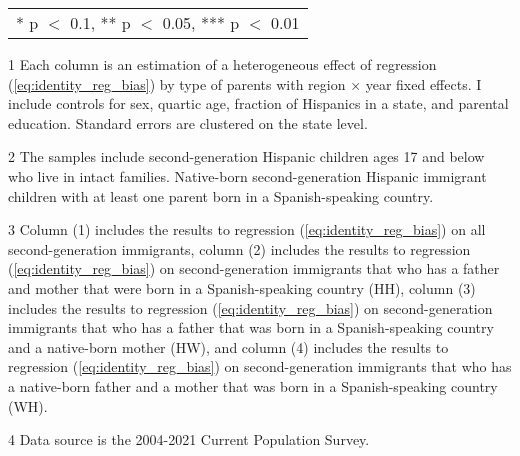 \begin{table}[H]
{\begin{threeparttable}
\begin{tabular}[t]{lcccc}
\bottomrule
\multicolumn{5}{l}{\rule{0pt}{1em}* p $<$ 0.1, ** p $<$ 0.05, *** p $<$ 0.01}\\
\end{tabular}
\begin{tablenotes}
\small
\item[1] \footnotesize{Each column is an estimation of a heterogeneous effect of regression (\ref{eq:identity_reg_bias}) by 
                      type of parents with region × year fixed effects. 
                      I include controls for sex, quartic age, fraction of Hispanics in a state, and parental education.
                      Standard errors are clustered on the state level.}
\item[2] \footnotesize{The samples include second-generation Hispanic children ages 17 and below who live in intact families. 
                      Native-born second-generation Hispanic 
                      immigrant children with at least one parent born in a Spanish-speaking 
                      country.}
\item[3] \footnotesize{Column (1) includes the results to regression (\ref{eq:identity_reg_bias}) on all second-generation immigrants, 
                                        column (2) includes the results to regression (\ref{eq:identity_reg_bias}) on second-generation immigrants that who has a father and mother that were born in a Spanish-speaking country (HH),
                                        column (3) includes the results to regression (\ref{eq:identity_reg_bias}) on second-generation immigrants that who has a father that was born in a Spanish-speaking country and a native-born mother (HW), and
                                        column (4) includes the results to regression (\ref{eq:identity_reg_bias}) on second-generation immigrants that who has a native-born father and a mother that was born in a Spanish-speaking country (WH).}
\item[4] \footnotesize{Data source is the 2004-2021 Current Population Survey.}
\end{tablenotes}
\end{threeparttable}}
\end{table}
